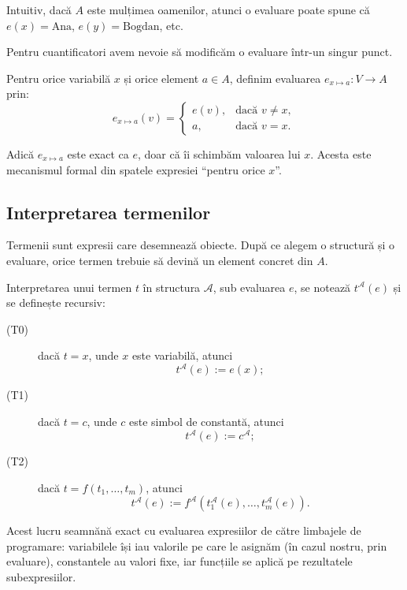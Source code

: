 Intuitiv, dacă \(A\) este mulțimea oamenilor, atunci o evaluare poate spune că \(e(x)=\text{Ana}\), \(e(y)=\text{Bogdan}\), etc.

Pentru cuantificatori avem nevoie să modificăm o evaluare într-un singur punct.

\begin{definition}
	Pentru orice variabilă \(x\) și orice element \(a \in A\), definim evaluarea \(e_{x \mapsto a} : V \to A\) prin:
	\[
		e_{x \mapsto a}(v) =
		\begin{cases}
			e(v), & \text{dacă } v \neq x, \\
			a,    & \text{dacă } v = x.
		\end{cases}
	\]
\end{definition}

Adică \(e_{x \mapsto a}\) este exact ca \(e\), doar că îi schimbăm valoarea lui \(x\). Acesta este mecanismul formal din spatele expresiei ``pentru orice \(x\)''.

\subsection{Interpretarea termenilor}

Termenii sunt expresii care desemnează obiecte. După ce alegem o structură și o evaluare, orice termen trebuie să devină un element concret din \(A\).

\begin{definition}
	Interpretarea unui termen \(t\) în structura \( \mathcal{A} \), sub evaluarea \(e\), se notează \(t^\mathcal{A}(e)\) și se definește recursiv:

	\begin{description}
		\item[(T0)] dacă \(t = x\), unde \(x\) este variabilă, atunci
			\[
				t^\mathcal{A}(e) := e(x);
			\]
		\item[(T1)] dacă \(t = c\), unde \(c\) este simbol de constantă, atunci
			\[
				t^\mathcal{A}(e) := c^\mathcal{A};
			\]
		\item[(T2)] dacă \(t = f(t_1,\dots,t_m)\), atunci
			\[
				t^\mathcal{A}(e) := f^\mathcal{A}\left(t_1^\mathcal{A}(e),\dots,t_m^\mathcal{A}(e)\right).
			\]
	\end{description}
\end{definition}

Acest lucru seamnănă exact cu evaluarea expresiilor de către limbajele de programare: variabilele își iau valorile pe care le asignăm (în cazul nostru, prin evaluare), constantele au valori fixe, iar funcțiile
se aplică pe rezultatele subexpresiilor.

